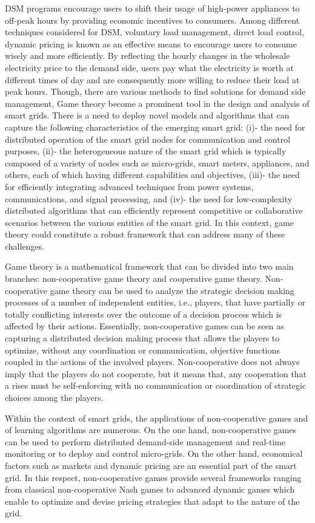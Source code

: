 \documentclass[12pt,twoside]{article}
\begin{document}
DSM programs encourage users to shift their usage of high-power appliances to off-peak hours by providing economic incentives to consumers. Among different techniques considered for DSM, voluntary load management, direct load control, dynamic pricing is known as an effective means to encourage users to consume wisely and more efficiently. By reflecting the hourly changes in the wholesale electricity price to the demand side, users pay what the electricity is worth at different times of day and are consequently more willing to reduce their load at peak hours.
Though, there are various methods to find solutions for demand side management, Game theory become a prominent tool in the design and analysis of smart grids. There is a need to deploy novel models and algorithms that can capture the following characteristics of the emerging smart grid: (i)- the need for distributed operation of the smart grid nodes for communication and control purposes, (ii)- the heterogeneous nature of the smart grid which is typically composed of a variety of nodes such as micro-grids, smart meters, appliances, and others, each of which having different capabilities and objectives, (iii)- the need for efficiently integrating advanced
techniques from power systems, communications, and signal processing, and (iv)- the need for low-complexity distributed algorithms that can efficiently represent competitive or collaborative scenarios between the various entities of the smart grid. In this context, game theory could constitute a robust framework that can address many of these challenges.

Game theory is a mathematical framework that can be divided into two main branches: non-cooperative game theory and cooperative game theory. Non-cooperative game theory can be used to analyze the strategic decision making processes of a number of independent entities, i.e., players, that have partially or totally conflicting interests over the outcome of a decision process which is affected by their actions. Essentially, non-cooperative games can be seen as capturing a distributed decision making process that allows the players to optimize, without any coordination or communication, objective functions coupled in the actions of the involved players. Non-cooperative does not always imply that the players do not cooperate, but it means that, any cooperation that a rises must be self-enforcing with no communication or coordination of strategic choices among the players.

Within the context of smart grids, the applications of non-cooperative games and of learning algorithms are numerous. On the one hand, non-cooperative games can be used to perform distributed demand-side management and real-time monitoring or to deploy and control micro-grids. On the other hand, economical factors such as markets and dynamic pricing are an essential part of the smart grid. In this respect, non-cooperative games provide several frameworks ranging from classical non-cooperative Nash games to advanced dynamic games which enable to optimize and devise pricing strategies that adapt to the nature of the grid.
\end{document}
